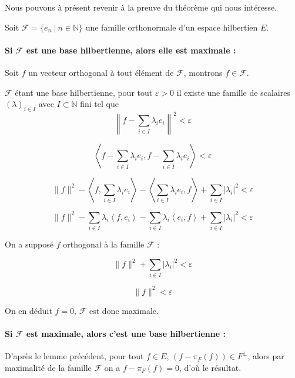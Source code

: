 	Nous pouvons à présent revenir à la preuve du théorème qui nous intéresse.
	
	\begin{myproof}
		Soit $\mathcal{F} = \{e_n ~ | ~ n \in \mathbb{N}\}$ une famille orthonormale d'un espace hilbertien $E$.
		
		\paragraph{Si $\mathcal{F}$ est une base hilbertienne, alors elle est maximale :}
		
		Soit $f$ un vecteur orthogonal à tout élément de $\mathcal{F}$, montrons $f \in \mathcal{F}$.
		
		$\mathcal{F}$ étant une base hilbertienne, pour tout $\varepsilon > 0$ il existe une famille de scalaires $(\lambda)_{i \in I}$ avec $I \subset \mathbb{N}$ fini tel que $$\left\|f - \sum_{i \in I} \lambda_i e_i\right\|^2 < \varepsilon$$
		
		$$\left\langle f - \sum_{i \in I} \lambda_i e_i, f - \sum_{i \in I} \lambda_i e_i \right\rangle < \varepsilon$$
		
		$$\|f\|^2 - \left\langle f, \sum_{i \in I} \lambda_i e_i \right\rangle - \left\langle \sum_{i \in I} \lambda_i e_i, f \right\rangle + \sum_{i \in I} |\lambda_i|^2 < \varepsilon$$
		
		$$\|f\|^2 - \sum_{i \in I} \lambda_i \left\langle f, e_i \right\rangle - \sum_{i \in I} \lambda_i \left\langle e_i, f \right\rangle + \sum_{i \in I} |\lambda_i|^2 < \varepsilon$$
		
		On a supposé $f$ orthogonal à la famille $\mathcal{F}$ :
		
		$$\|f\|^2 + \sum_{i \in I} |\lambda_i|^2 < \varepsilon$$
		
		$$\|f\|^2 < \varepsilon$$
		
		On en déduit $f = 0$, $\mathcal{F}$ est donc maximale.
		
		\paragraph{Si $\mathcal{F}$ est maximale, alors c'est une base hilbertienne :}
		
		D'après le lemme précédent, pour tout $f \in E$, $(f - \pi_F(f)) \in F^\bot$, alors par maximalité de la famille $\mathcal{F}$ on a $f - \pi_F(f) = 0$, d'où le résultat.
		
		\cqfd
	\end{myproof}
	
